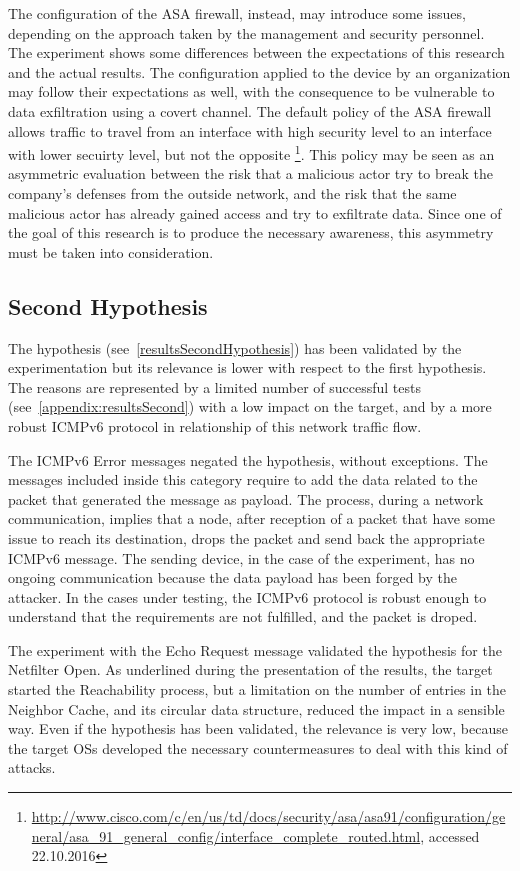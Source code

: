 \documentclass[12pt]{article}
\begin{document}
The configuration of the ASA firewall, instead, may introduce some issues, depending on the approach taken by the management and security personnel. The experiment shows some differences between the expectations of this research and the actual results. The configuration applied to the device by an organization may follow their expectations as well, with the consequence to be vulnerable to data exfiltration using a covert channel. The default policy of the ASA firewall allows traffic to travel from an interface with high security level to an interface with lower secuirty level, but not the opposite \footnote{\url{http://www.cisco.com/c/en/us/td/docs/security/asa/asa91/configuration/general/asa_91_general_config/interface_complete_routed.html}, accessed 22.10.2016}. This policy may be seen as an asymmetric evaluation between the risk that a malicious actor try to break the company's defenses from the outside network, and the risk that the same malicious actor has already gained access and try to exfiltrate data. Since one of the goal of this research is to produce the necessary awareness, this asymmetry must be taken into consideration.

\subsection{Second Hypothesis}

The hypothesis (see~\cref{resultsSecondHypothesis}) has been validated by the experimentation but its relevance is lower with respect to the first hypothesis. The reasons are represented by a limited number of successful tests (see~\cref{appendix:resultsSecond}) with a low impact on the target, and by a more robust ICMPv6 protocol in relationship of this network traffic flow.

The ICMPv6 Error messages negated the hypothesis, without exceptions. The messages included inside this category require to add the data related to the packet that generated the message as payload. The process, during a network communication, implies that a node, after reception of a packet that have some issue to reach its destination, drops the packet and send back the appropriate ICMPv6 message. The sending device, in the case of the experiment, has no ongoing communication because the data payload has been forged by the attacker. In the cases under testing, the ICMPv6 protocol is robust enough to understand that the requirements are not fulfilled, and the packet is droped.

The experiment with the Echo Request message validated the hypothesis for the Netfilter Open. As underlined during the presentation of the results, the target started the Reachability process, but a limitation on the number of entries in the Neighbor Cache, and its circular data structure, reduced the impact in a sensible way. Even if the hypothesis has been validated, the relevance is very low, because the target OSs developed the necessary countermeasures to deal with this kind of attacks.
\end{document}
